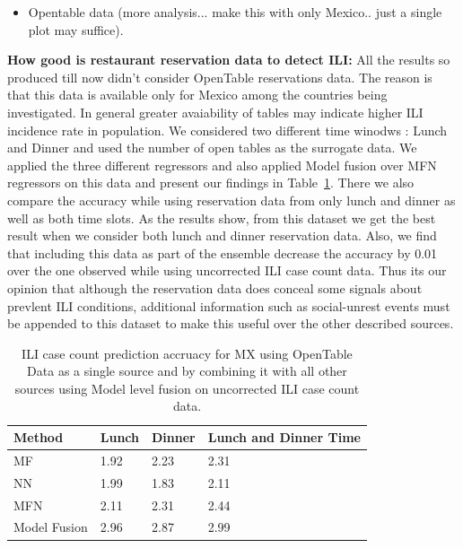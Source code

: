 \begin{itemize}
  \item Opentable data (more analysis... make this with only Mexico.. just a single plot may suffice). 
\end{itemize}


{\noindent \textbf{How good is restaurant reservation data to detect ILI: }} All the results so produced till now
didn't consider OpenTable reservations data. The reason is that this data is available only for Mexico among the 
countries being investigated. In general greater avaiability of tables may indicate higher ILI incidence rate in population.
We considered two different time winodws : Lunch and Dinner and used the number of open tables as the surrogate data.
We applied the three different regressors and also applied Model fusion over MFN regressors on this data and present 
our findings in Table~\ref{tb:opentable}. There we also compare the accuracy while using reservation 
data from only lunch and dinner as well as both time slots. As the results show, from this dataset we get the best 
result when we consider both lunch and dinner reservation data. Also, we find that including this data as part of the
ensemble decrease the accuracy by 0.01 over the one observed while using uncorrected ILI case count data. Thus its 
our opinion that although the reservation data does conceal some signals about prevlent ILI conditions, additional
information such as social-unrest events must be appended to this dataset to make this useful over the 
other described sources.

\begin{table}[tb!]
\centering
\caption{\label{tb:opentable}  ILI case count prediction accruacy for MX using OpenTable Data as a single source and
by combining it with all other sources using Model level fusion on uncorrected ILI case count data.}
\vspace{1em}
\begin{tabular}{|p{1.5cm}|*{2}{l|}p{2cm}|}
\hline
Method& Lunch & Dinner & Lunch and Dinner Time \\
\hline \hline
MF   & 1.92 & 2.23 & 2.31 \\
NN   & 1.99 & 1.83 & 2.11 \\
MFN  & 2.11 & 2.31 & 2.44 \\
Model Fusion & 2.96 & 2.87 & 2.99 \\
\hline
\end{tabular}
\end{table}


